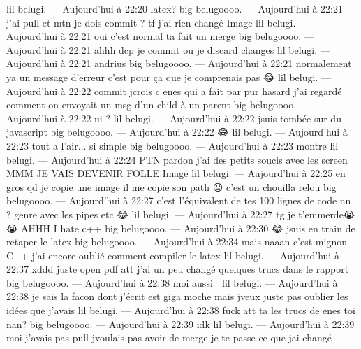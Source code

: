 \documentclass[utf8]{article}
\begin{document}
lil belugi. — Aujourd’hui à 22:20
latex?
big belugoooo. — Aujourd’hui à 22:21
j'ai pull et mtn je dois commit ? tf
j'ai rien changé
Image
lil belugi. — Aujourd’hui à 22:21
oui c'est normal
ta fait un merge
big belugoooo. — Aujourd’hui à 22:21
ahhh
dcp je commit ou je discard changes
lil belugi. — Aujourd’hui à 22:21
andrius
big belugoooo. — Aujourd’hui à 22:21
normalement ya un message d'erreur c'est pour ça que je comprenais pas 😂
lil belugi. — Aujourd’hui à 22:22
commit jcrois c enes qui a fait
par pur hasard
j'ai regardé comment on envoyait un msg d'un child à un parent
big belugoooo. — Aujourd’hui à 22:22
ui ?
lil belugi. — Aujourd’hui à 22:22
jsuis tombée sur du javascript
big belugoooo. — Aujourd’hui à 22:22
😂
lil belugi. — Aujourd’hui à 22:23
tout a l'air... si simple
big belugoooo. — Aujourd’hui à 22:23
montre
lil belugi. — Aujourd’hui à 22:24
PTN pardon
j'ai des petits soucis avec les screen
MMM JE VAIS DEVENIR FOLLE
Image
lil belugi. — Aujourd’hui à 22:25
en gros qd je copie une image
il me copie son path
😐
c'est un chouilla relou
big belugoooo. — Aujourd’hui à 22:27
c'est l'équivalent de tes 100 lignes de code nn ?
genre avec les pipes etc 😂
lil belugi. — Aujourd’hui à 22:27
tg
je t'emmerde😭 😭
AHHH
I hate c++
big belugoooo. — Aujourd’hui à 22:30
😂
jsuis en train de retaper le latex
big belugoooo. — Aujourd’hui à 22:34
mais naaan
c'est mignon C++
j'ai encore oublié comment compiler le latex
lil belugi. — Aujourd’hui à 22:37
xddd
juste open pdf
att j'ai un peu changé quelques trucs dans le rapport
big belugoooo. — Aujourd’hui à 22:38
moi aussi 🙂
lil belugi. — Aujourd’hui à 22:38
je sais la facon dont j'écrit est giga moche mais jveux juste pas oublier les idées que j'avais
lil belugi. — Aujourd’hui à 22:38
fuck
att
ta les trucs de enes toi nan?
big belugoooo. — Aujourd’hui à 22:39
idk
lil belugi. — Aujourd’hui à 22:39
moi j'avais pas pull jvoulais pas avoir de merge
je te passe ce que jai changé
\end{document}
